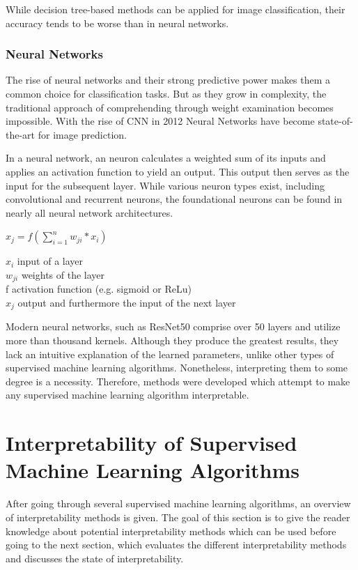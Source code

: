 While decision tree-based methods can be applied for image classification, their accuracy tends to be worse than in neural networks.


\subsection{Neural Networks}


The rise of neural networks and their strong predictive power makes them a common choice for classification tasks. But as they grow in complexity, the traditional approach of comprehending through weight examination becomes impossible. With the rise of CNN in 2012 \cite{krizhevsky2012nn} Neural Networks have become state-of-the-art for image prediction. 

In a neural network, an neuron calculates a weighted sum of its inputs and applies an activation function to yield an output. This output then serves as the input for the subsequent layer. While various neuron types exist, including convolutional and recurrent neurons, the foundational neurons can be found in nearly all neural network architectures. 

$x_j = f(\sum_{i=1}^{n} w_{ji} \ast x_i)$

\textbullet$x_i$ input of a layer\\
\textbullet $w_{ji}$ weights of the layer\\
\textbullet f activation function (e.g. sigmoid or ReLu)\\
\textbullet $x_j$ output and furthermore the input of the next layer

Modern neural networks, such as ResNet50 \cite{he2015deep} comprise over 50 layers and utilize more than thousand kernels. Although they produce the greatest results, they lack an intuitive explanation of the learned parameters, unlike other types of supervised machine learning algorithms.  Nonetheless, interpreting them to some degree is a necessity. Therefore, methods were developed which attempt to make any supervised machine learning algorithm interpretable.

\chapter{Interpretability of Supervised Machine Learning Algorithms}
\label{sec:IoNN}


After going through several supervised machine learning algorithms, an overview of interpretability methods is given. The goal of this section is to give the reader knowledge about potential interpretability methods which can be used before going to the next section, which evaluates the different interpretability methods and discusses the state of interpretability.


